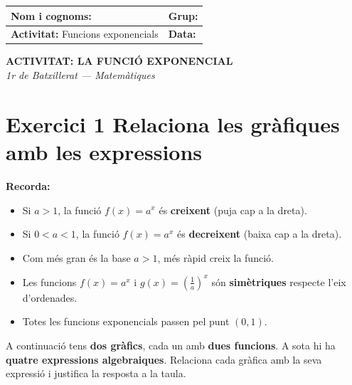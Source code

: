 \documentclass[12pt,a4paper]{article}
\begin{document}
\begingroup
\renewcommand{\arraystretch}{2.2}
\begin{tabularx}{\textwidth}{|X|p{4cm}|}
    \hline
    \textbf{Nom i cognoms:} & \textbf{Grup:} \\ \hline
    \textbf{Activitat:} Funcions exponencials & \textbf{Data:} \\ \hline
\end{tabularx}
\endgroup

\vspace{0.5cm}

\begin{center}
    {\Large \textbf{ACTIVITAT: LA FUNCI\'O EXPONENCIAL}}\\[4pt]
    {\small \textit{1r de Batxillerat --- Matem\`atiques}}
\end{center}

\vspace{0.3cm}

\section*{Exercici 1 \quad Relaciona les gr\`afiques amb les expressions}

\begin{recordatori}
\textbf{Recorda:}
\begin{itemize}[noitemsep]
    \item Si $a > 1$, la funci\'o $f(x)=a^x$ \'es \textbf{creixent} (puja cap a la dreta).
    \item Si $0 < a < 1$, la funci\'o $f(x)=a^x$ \'es \textbf{decreixent} (baixa cap a la dreta).
    \item Com m\'es gran \'es la base $a > 1$, m\'es r\`apid creix la funci\'o.
    \item Les funcions $f(x)=a^x$ i $g(x)=\left(\tfrac{1}{a}\right)^x$ s\'on \textbf{sim\`etriques} respecte l'eix d'ordenades.
    \item Totes les funcions exponencials passen pel punt $(0,1)$.
\end{itemize}
\end{recordatori}

\vspace{0.4cm}

A continuaci\'o tens \textbf{dos gr\`afics}, cada un amb \textbf{dues funcions}. A sota hi ha \textbf{quatre expressions algebraiques}. Relaciona cada gr\`afica amb la seva expressi\'o i justifica la resposta a la taula.
\end{document}
